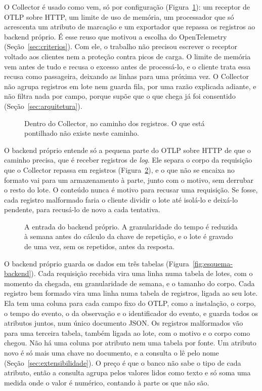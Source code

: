 O Collector é usado como vem, só por configuração
(Figura~\ref{fig:collector}): um receptor de OTLP sobre
HTTP, um limite de uso de memória, um processador que só acrescenta um
atributo de marcação e um exportador que repassa os registros ao backend
próprio. É esse reuso que motivou a escolha do OpenTelemetry
(Seção~\ref{sec:criterios}). Com ele, o trabalho não precisou escrever o receptor
voltado aos clientes nem a proteção contra picos de carga. O limite de memória
vem antes de tudo e recusa o excesso antes de processá-lo, e o cliente trata
essa recusa como passageira, deixando as linhas para uma próxima vez. O
Collector não agrupa registros em lote nem guarda fila, por uma razão
explicada adiante, e não filtra nada por campo, porque supõe que o que chega já
foi consentido (Seção~\ref{sec:arquitetura}).

\begin{figure}[!ht]
  \centering
  \resizebox{\textwidth}{!}{}
  \caption{Dentro do Collector, no caminho dos registros. O que está
    pontilhado não existe neste caminho.}
  \label{fig:collector}
\end{figure}

O backend próprio entende só a pequena parte do OTLP sobre HTTP de que o
caminho precisa, que é receber registros de \textit{log}. Ele separa o corpo da
requisição que o Collector repassa em registros
(Figura~\ref{fig:backend-entrada}), e o que não se encaixa no formato vai para um
armazenamento à parte, junto com o motivo, sem derrubar o resto do lote. O
conteúdo nunca é motivo para recusar uma requisição. Se fosse, cada registro
malformado faria o cliente dividir o lote até isolá-lo e deixá-lo pendente,
para recusá-lo de novo a cada tentativa.

\begin{figure}[!ht]
  \centering
  \resizebox{\textwidth}{!}{}
  \caption{A entrada do backend próprio. A granularidade do tempo é reduzida à
    semana antes do cálculo da chave de repetição, e o lote é gravado de uma
    vez, sem os repetidos, antes da resposta.}
  \label{fig:backend-entrada}
\end{figure}

O backend próprio guarda os dados em três tabelas
(Figura~\ref{fig:esquema-backend}). Cada requisição recebida vira uma linha numa
tabela de lotes, com o momento da chegada, em granularidade de semana, e o
tamanho do corpo. Cada registro bem formado vira uma linha numa tabela de
registros, ligada ao seu lote. Ela tem uma coluna para cada campo fixo do OTLP,
como a instalação, o corpo, o tempo do evento, o da observação e o
identificador do evento, e guarda todos os atributos juntos, num único
documento JSON. Os registros malformados vão para uma terceira tabela, também
ligada ao lote, com o motivo e o corpo como chegou. Não há uma coluna por
atributo nem uma tabela por fonte. Um atributo novo é só mais uma chave no
documento, e a consulta o lê pelo nome (Seção~\ref{sec:extensibilidade}). O
preço é que o banco não sabe o tipo de cada atributo, então a consulta agrupa pelos
valores lidos como texto e só soma uma medida onde o valor é numérico,
contando à parte os que não são.

